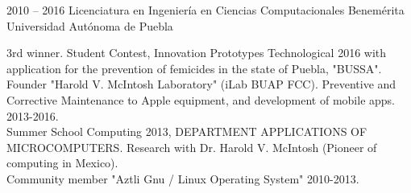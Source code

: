 \documentclass[8pt]{developercv} %
\begin{document}
\begin{entrylist}
	\entry
		{2010 -- 2016}
		{Licenciatura en Ingenier\'ia en Ciencias Computacionales}
		{Benem\'erita Universidad Aut\'onoma de Puebla}
		{

	3rd winner. Student Contest, Innovation Prototypes Technological 2016 with application for the prevention of femicides in the state of Puebla, "BUSSA".\\

	Founder "Harold V. McIntosh Laboratory" (iLab BUAP FCC). Preventive and Corrective Maintenance to Apple equipment, and development of mobile apps. 2013-2016.\\

	Summer School Computing 2013, DEPARTMENT APPLICATIONS OF MICROCOMPUTERS. Research with Dr. Harold V. McIntosh (Pioneer of computing in Mexico).\\

	Community member "Aztli Gnu / Linux Operating System" 2010-2013.\\





		
		}
		
\end{entrylist}

\end{document}
